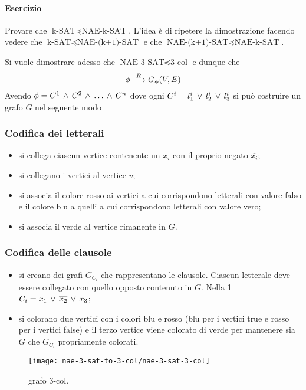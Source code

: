 \paragraph{Esercizio} Provare che $\text{k-SAT}\preceq\text{NAE-k-SAT}$. L'idea è di ripetere la dimostrazione facendo vedere che $\text{k-SAT}\preceq\text{NAE-(k+1)-SAT}$ e che $\text{NAE-(k+1)-SAT}\preceq \text{NAE-k-SAT}$.
\begin{demonstration}
	
	Si vuole dimostrare adesso che $\text{NAE-3-SAT}\preceq\text{3-col}$ e dunque che \[\phi\xlongrightarrow{R}G_\phi(V,E)\] Avendo $\phi=C^1\,\wedge\, C^2\,\wedge\,\dots\,\wedge\, C^n$ dove ogni $C^i=l_1^i\,\vee\, l_2^i\,\vee\, l_3^i$ si può costruire un grafo $G$ nel seguente modo
	\subsubsection{Codifica dei letterali}
	\begin{itemize}
		\item si collega ciascun vertice contenente un $x_i$ con il proprio negato $\overline{x_i}$;
		\item si collegano i vertici al vertice $v$;
		\item si associa il colore rosso ai vertici a cui corrispondono letterali con valore falso e il colore blu a quelli a cui corrispondono letterali con valore vero;
		\item si associa il verde al vertice rimanente in $G$.
	\end{itemize}
	\subsubsection{Codifica delle clausole}
	\begin{itemize}
		\item si creano dei grafi $G_{C_i}$ che rappresentano le clausole. Ciascun letterale deve essere collegato con quello opposto contenuto in $G$. Nella \cref{fig:rgb-graph} $C_i = x_1 \,\vee\, \overline{x_2}\,\vee\, x_3$;
		\item si colorano due vertici con i colori blu e rosso (blu per i vertici true e rosso per i vertici false) e il terzo vertice viene colorato di verde per mantenere sia $G$ che $G_{C_i}$ propriamente colorati.
	\end{itemize}
	\begin{figure}[thbp]
		\centering
		\texttt{[image: nae-3-sat-to-3-col/nae-3-sat-3-col]}
		\caption{grafo 3-col.}
		\label{fig:rgb-graph}
	\end{figure}

\end{demonstration}
